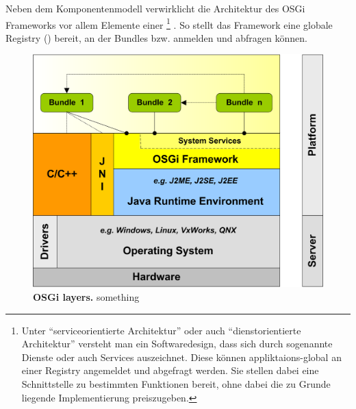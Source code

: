 Neben dem Komponentenmodell verwirklicht die Architektur des OSGi Frameworks
vor allem Elemente einer 
\footnote{Unter \enquote{serviceorientierte Architektur} oder auch
\enquote{dienstorientierte Architektur} versteht man ein Softwaredesign, dass
sich durch sogenannte Dienste oder auch Services auszeichnet. Diese können
appliktaions-global an einer Registry angemeldet und abgefragt werden.
Sie stellen dabei eine Schnittstelle zu bestimmten Funktionen bereit, ohne
dabei die zu Grunde liegende Implementierung preiszugeben.}
.
So stellt das Framework eine globale Registry ()
bereit, an der Bundles  bzw.  anmelden und
abfragen können.
\citep{wtherich_die_2008}

\begin{figure}[htbp]
	\begin{center}
		\includegraphics[scale=1.3]{pics/osgi_layer.png}
	\caption[OSGi layers]{
	\textbf{OSGi layers.}
	something}
	\end{center}
	\label{fig:osgi_layer}
\end{figure}



